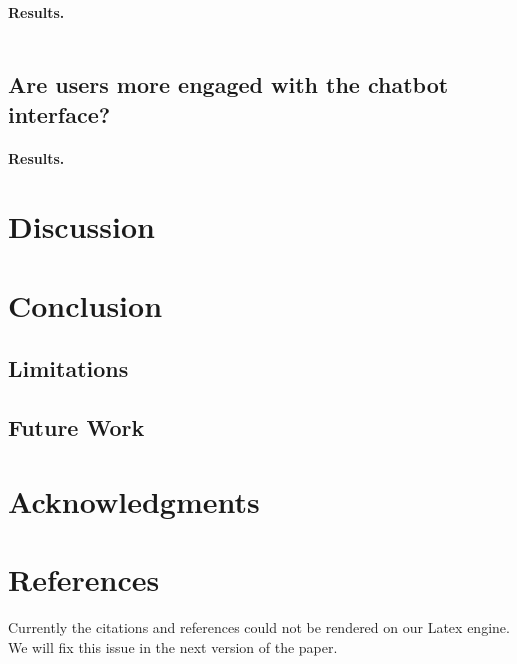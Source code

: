 \documentclass[11pt, onecolumn]{article}
\newcounter{para}
\begin{document}

\paragraph{Results.}

\begin{table} \label{tab:model-comparison}
  \centering
  \begin{tabular}{lll}

  \end{tabular}
\end{table}

\subsection{Are users more engaged with the chatbot interface?} \label{sec:engagement}

\paragraph{Results.}

\section{Discussion}
\section{Conclusion}
\subsection{Limitations}
\subsection{Future Work}

\section*{Acknowledgments}
\section*{References}
%
%
Currently the citations and references could not be rendered on our Latex engine. We will fix this issue in the next version of the paper.
\end{document}
